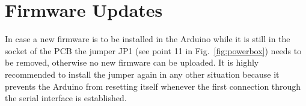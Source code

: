 \documentclass{scrartcl}
\begin{document}
\section{Firmware Updates}
In case a new firmware is to be installed in the Arduino while it is still in
the socket of the PCB the jumper JP1 (see point 11 in Fig.~\ref{fig:powerbox})
needs to be removed, otherwise no new firmware can be uploaded. It is highly
recommended to install the jumper again in any other situation because it
prevents the Arduino from resetting itself whenever the first connection through
the serial interface is established.
\end{document}
